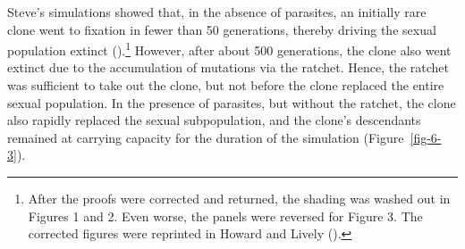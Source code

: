 \documentclass[
  letterpaper,
]{book}
\begin{document}
Steve's simulations showed that, in the absence of parasites, an
initially rare clone went to fixation in fewer than 50 generations,
thereby driving the sexual population extinct
().\footnote{After the
  proofs were corrected and returned, the shading was washed out in
  Figures 1 and 2. Even worse, the panels were reversed for Figure 3.
  The corrected figures were reprinted in Howard and Lively
  ().} However, after about 500
generations, the clone also went extinct due to the accumulation of
mutations via the ratchet. Hence, the ratchet was sufficient to take out
the clone, but not before the clone replaced the entire sexual
population. In the presence of parasites, but without the ratchet, the
clone also rapidly replaced the sexual subpopulation, and the clone's
descendants remained at carrying capacity for the duration of the
simulation (Figure~\ref{fig-6-3}).
\end{document}
